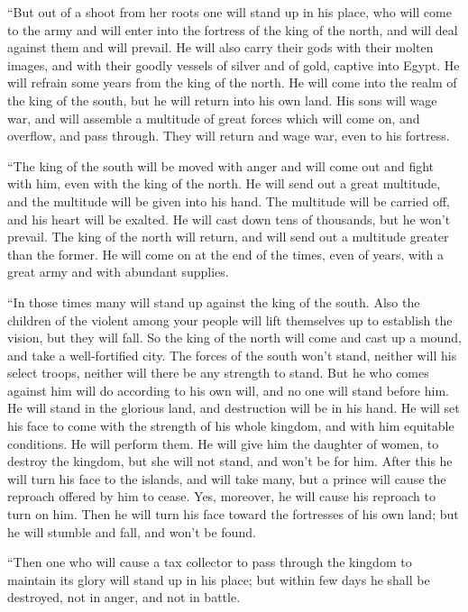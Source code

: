 \myverse{}“But out of a shoot from her roots one will stand up in his place,
who will come to the army and will enter into the fortress of the king of the north, and will deal against
them and will prevail.
\myverse{}He will also carry their gods with their molten images, and with their goodly
vessels of silver and of gold, captive into Egypt. He will refrain some years from the king of the north.
\myverse{}He will come into the realm of the king of the south, but he will return into
his own land.
\myverse{}His sons will wage war, and will assemble a multitude of great forces which
will come on, and overflow, and pass through. They will return and wage war, even to his fortress.

\myverse{}“The king of the south will be moved with anger and will come
out and fight with him, even with the king of the north. He will send out a great multitude, and the multitude
will be given into his hand.
\myverse{}The multitude will be carried off, and his heart will be exalted. He will
cast down tens of thousands, but he won’t prevail.
\myverse{}The king of the north will return, and will send out a multitude greater
than the former. He will come on at the end of the times, even of years, with a great army and with abundant
supplies.

\myverse{}“In those times many will stand up against the king of the south.
Also the children of the violent among your people will lift themselves up to establish the vision, but
they will fall.
\myverse{}So the king of the north will come and cast up a mound, and take a well-fortified
city. The forces of the south won’t stand, neither will his select troops, neither will there be any strength
to stand.
\myverse{}But he who comes against him will do according to his own will, and no one
will stand before him. He will stand in the glorious land, and destruction will be in his hand.
\myverse{}He will set his face to come with the strength of his whole kingdom, and
with him equitable conditions. He will perform them. He will give him the daughter of women, to destroy
the kingdom, but she will not stand, and won’t be for him.
\myverse{}After this he will turn his face to the islands, and will take many, but
a prince will cause the reproach offered by him to cease. Yes, moreover, he will cause his reproach to
turn on him.
\myverse{}Then he will turn his face toward the fortresses of his own land; but he
will stumble and fall, and won’t be found.

\myverse{}“Then one who will cause a tax collector to pass through the
kingdom to maintain its glory will stand up in his place; but within few days he shall be destroyed, not
in anger, and not in battle.

